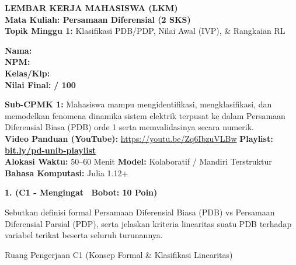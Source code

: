 \documentclass[10pt,a4paper]{article}
\begin{document}
\noindent\begin{minipage}[c]{0.68\textwidth}%
  {\large\textbf{\color{unibblue}LEMBAR KERJA MAHASISWA (LKM)}}\\[1mm]
  {\normalsize\textbf{Mata Kuliah: Persamaan Diferensial (2 SKS)}}\\[0.5mm]
  {\small\textbf{Topik Minggu 1:} Klasifikasi PDB/PDP, Nilai Awal (IVP), \& Rangkaian RL}%
\end{minipage}%
\hfill%
\begin{minipage}[c]{0.30\textwidth}%
  \begin{tcolorbox}[colback=unibblue!5,colframe=unibblue,boxrule=0.6pt,arc=2pt,left=4pt,right=4pt,top=2pt,bottom=2pt]
    \scriptsize
    \textbf{Nama:} \dotfill\\[1.2mm]
    \textbf{NPM:} \dotfill\\[1.2mm]
    \textbf{Kelas/Klp:} \dotfill\\[1.2mm]
    \textbf{Nilai Final:} \hfill \textbf{/ 100}
  \end{tcolorbox}%
\end{minipage}\par

\vspace{1.5mm}

\begin{tcolorbox}[colback=boxbg,colframe=unibgold!90!black,boxrule=0.6pt,arc=2pt,left=5pt,right=5pt,top=3pt,bottom=3pt,title=\textbf{\scriptsize Capaian Pembelajaran (Sub-CPMK 1) \& Pedoman Evaluasi OBE}]
  \scriptsize
  \textbf{Sub-CPMK 1:} Mahasiswa mampu mengidentifikasi, mengklasifikasi, dan memodelkan fenomena dinamika sistem elektrik terpusat ke dalam Persamaan Diferensial Biasa (PDB) orde 1 serta memvalidasinya secara numerik.\\
  \textbf{Video Panduan (YouTube):} \url{https://youtu.be/Zq6IbzuVLBw} \hfill \textbf{Playlist:} \href{https://www.youtube.com/playlist?list=PLS5oOZWXZeTw}{\color{unibblue}\textbf{bit.ly/pd-unib-playlist}}\\\textbf{Alokasi Waktu:} 50--60 Menit \quad\textbar\quad \textbf{Model:} Kolaboratif / Mandiri Terstruktur \quad\textbar\quad \textbf{Bahasa Komputasi:} Julia 1.12+
\end{tcolorbox}

\vspace{1mm}

\noindent\textbf{1. (C1 - Mengingat \textbar\ Bobot: 10 Poin)}\par\vspace{0.5mm}
{\footnotesize Sebutkan definisi formal Persamaan Diferensial Biasa (PDB) vs Persamaan Diferensial Parsial (PDP), serta jelaskan kriteria linearitas suatu PDB terhadap variabel terikat beserta seluruh turunannya.}
\begin{answerbox}{Ruang Pengerjaan C1 (Konsep Formal \& Klasifikasi Linearitas)}
  \vspace{2.0cm}
\end{answerbox}
\end{document}

